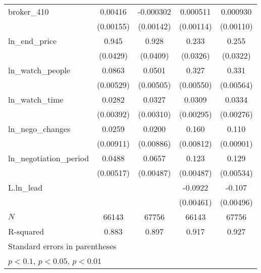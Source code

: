 {\begin{tabular}{l*{4}{c}}
\addlinespace
broker\_410  &     0.00416\sym{***}&   -0.000302         &    0.000511         &    0.000930         \\
            &   (0.00155)         &   (0.00142)         &   (0.00114)         &   (0.00110)         \\
\addlinespace
ln\_end\_price&       0.945\sym{***}&       0.928\sym{***}&       0.233\sym{***}&       0.255\sym{***}\\
            &    (0.0429)         &    (0.0409)         &    (0.0326)         &    (0.0322)         \\
\addlinespace
ln\_watch\_people&      0.0863\sym{***}&      0.0501\sym{***}&       0.327\sym{***}&       0.331\sym{***}\\
            &   (0.00529)         &   (0.00505)         &   (0.00550)         &   (0.00564)         \\
\addlinespace
ln\_watch\_time&      0.0282\sym{***}&      0.0327\sym{***}&      0.0309\sym{***}&      0.0334\sym{***}\\
            &   (0.00392)         &   (0.00310)         &   (0.00295)         &   (0.00276)         \\
\addlinespace
ln\_nego\_changes&      0.0259\sym{***}&      0.0200\sym{**} &       0.160\sym{***}&       0.110\sym{***}\\
            &   (0.00911)         &   (0.00886)         &   (0.00812)         &   (0.00901)         \\
\addlinespace
ln\_negotiation\_period&      0.0488\sym{***}&      0.0657\sym{***}&       0.123\sym{***}&       0.129\sym{***}\\
            &   (0.00517)         &   (0.00487)         &   (0.00487)         &   (0.00534)         \\
\addlinespace
L.ln\_lead   &                     &                     &     -0.0922\sym{***}&      -0.107\sym{***}\\
            &                     &                     &   (0.00461)         &   (0.00496)         \\
\midrule
\(N\)       &       66143         &       67756         &       66143         &       67756         \\
R-squared   &       0.883         &       0.897         &       0.917         &       0.927         \\
\bottomrule
\multicolumn{5}{l}{\footnotesize Standard errors in parentheses}\\
\multicolumn{5}{l}{\footnotesize \sym{*} \(p<0.1\), \sym{**} \(p<0.05\), \sym{***} \(p<0.01\)}\\
\end{tabular}
}
